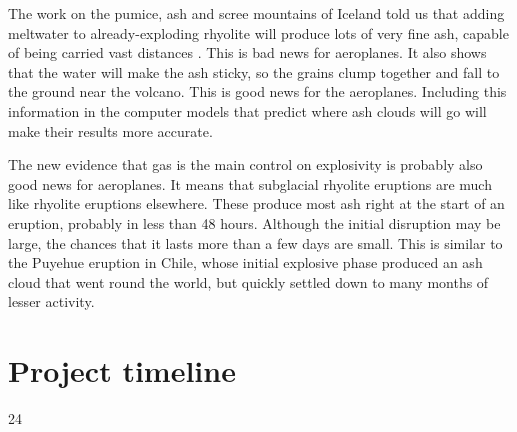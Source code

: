 \documentclass[a4paper,11pt]{article}
\begin{document}
The work on the pumice, ash and scree mountains of Iceland told us that adding meltwater to already-exploding rhyolite will produce lots of very fine ash, capable of being carried vast distances \citep{stevenson_explosive_2011}. This is bad news for aeroplanes. It also shows that the water will make the ash sticky, so the grains clump together and fall to the ground near the volcano. This is good news for the aeroplanes. Including this information in the computer models that predict where ash clouds will go will make their results more accurate.

The new evidence that gas is the main control on explosivity is probably also good news for aeroplanes. It means that subglacial rhyolite eruptions are much like rhyolite eruptions elsewhere. These produce most ash right at the start of an eruption, probably in less than 48 hours. Although the initial disruption may be large, the chances that it lasts more than a few days are small. This is similar to the Puyehue eruption in Chile, whose initial explosive phase produced an ash cloud that went round the world, but quickly settled down to many months of lesser activity.
\section{Project timeline}
\begin{center}
\begin{ganttchart}%
[y unit title=0.7cm,
y unit chart=0.5cm,
x unit=0.5cm,
vgrid,
title/.style={draw=none,fill=gray!80},
title label font=\sffamily\bfseries\color{white},
title label anchor/.style={below=-0.8ex},
title left shift=.05,
title right shift=-.05,
title height=1,
bar/.style={fill=gray!30},
bar height=.6,
bar label font=\small\color{black!80},
bar label inline anchor/.style=above,
milestone label inline anchor/.style=below,
milestone label font=\sffamily\footnotesize,
group right shift=0,
group top shift=.6,
group height=.3,
group peaks={}{}{.2},
incomplete/.style={fill=red}]{24}
	 \\
	 \\
	 \\
	 \\
	 \\
\end{ganttchart}
\end{center}
\end{document}
